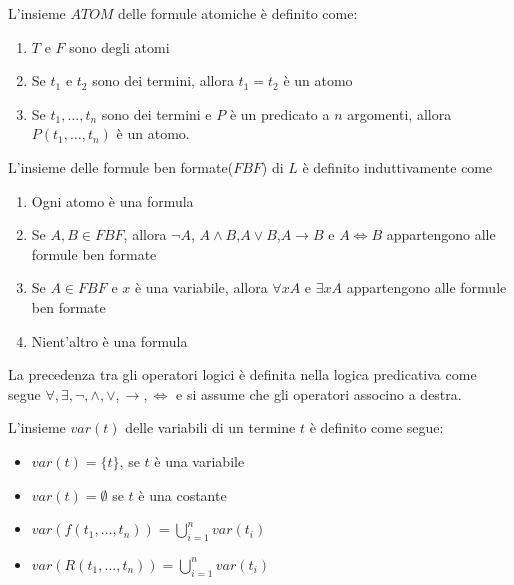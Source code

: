 \begin{defi}
    L'insieme $ATOM$ delle formule atomiche è definito come:
    \begin{enumerate}
        \item $T$ e $F$ sono degli atomi
        \item Se $t_1$ e $t_2$ sono dei termini, allora $t_1 = t_2$ è un atomo
        \item Se $t_1,\dots,t_n$ sono dei termini e $P$ è un predicato a $n$ argomenti,
              allora $P(t_1,\dots,t_n)$ è un atomo.
    \end{enumerate}
\end{defi}

\begin{defi}
    L'insieme delle formule ben formate($FBF$) di $L$ è definito induttivamente come
    \begin{enumerate}
        \item Ogni atomo è una formula
        \item Se $A,B \in FBF$, allora $\neg A$, $A \land B$,$A \lor B$,$A \rightarrow B$
              e $A \iff B$ appartengono alle formule ben formate
        \item Se $A \in FBF$ e $x$ è una variabile, allora $\forall x A$ e $\exists x A$
              appartengono alle formule ben formate
        \item Nient'altro è una formula
    \end{enumerate}
\end{defi}


La precedenza tra gli operatori logici è definita nella logica predicativa come segue
$\forall,\exists,\neg,\land,\lor,\rightarrow,\iff$ e si assume che gli operatori associno a destra.


\begin{defi}
    L'insieme $var(t)$ delle variabili di un termine $t$ è definito come segue:
    \begin{itemize}
        \item $var(t) = \{t \}$, se $t$ è una variabile
        \item $var(t) = \emptyset$ se $t$ è una costante
        \item $var(f(t_1,\dots,t_n)) = \bigcup _{i = 1} ^n var(t_i)$
        \item $var(R(t_1,\dots,t_n)) = \bigcup _{i = 1} ^ n var(t_i)$
    \end{itemize}
\end{defi}

